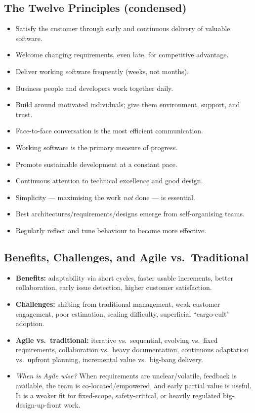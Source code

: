 \documentclass[hidelinks]{article}
\begin{document}
\subsection{The Twelve Principles (condensed)}
\begin{itemize}
  \item Satisfy the customer through early and continuous delivery of valuable software.
  \item Welcome changing requirements, even late, for competitive advantage.
  \item Deliver working software frequently (weeks, not months).
  \item Business people and developers work together daily.
  \item Build around motivated individuals; give them environment, support, and trust.
  \item Face-to-face conversation is the most efficient communication.
  \item Working software is the primary measure of progress.
  \item Promote sustainable development at a constant pace.
  \item Continuous attention to technical excellence and good design.
  \item Simplicity --- maximising the work \emph{not} done --- is essential.
  \item Best architectures/requirements/designs emerge from self-organising teams.
  \item Regularly reflect and tune behaviour to become more effective.
\end{itemize}

\subsection{Benefits, Challenges, and Agile vs.\ Traditional}
\begin{itemize}
  \item \textbf{Benefits:} adaptability via short cycles, faster usable increments, better
        collaboration, early issue detection, higher customer satisfaction.
  \item \textbf{Challenges:} shifting from traditional management, weak customer engagement,
        poor estimation, scaling difficulty, superficial ``cargo-cult'' adoption.
  \item \textbf{Agile vs.\ traditional:} iterative vs.\ sequential, evolving vs.\ fixed
        requirements, collaboration vs.\ heavy documentation, continuous adaptation vs.\ upfront
        planning, incremental value vs.\ big-bang delivery.
  \item \emph{When is Agile wise?} When requirements are unclear/volatile, feedback is available,
        the team is co-located/empowered, and early partial value is useful. It is a weaker fit for
        fixed-scope, safety-critical, or heavily regulated big-design-up-front work.
\end{itemize}
\end{document}
